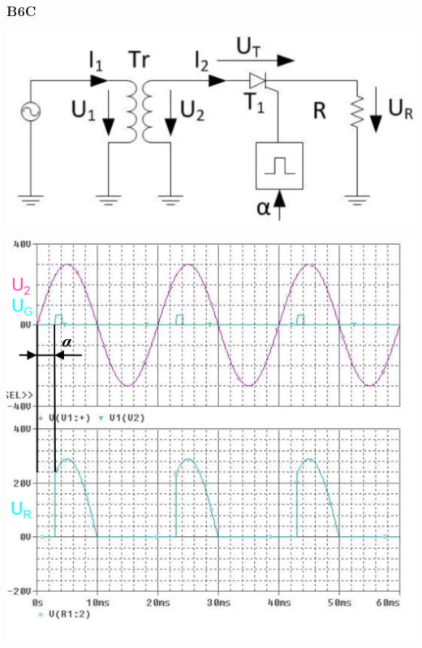 \subsubsection{B6C}
\vspace{-0.5cm}
\begin{minipage}{0.4\linewidth}
    \includegraphics[width=\linewidth]{images/GRM1c}
\end{minipage}
\begin{minipage}{0.35\linewidth}
    \centering 
    \includegraphics[width=\linewidth]{images/M1CKl}
    
\end{minipage}
